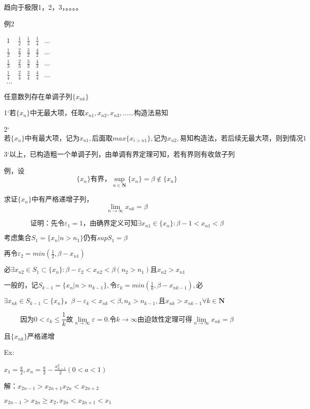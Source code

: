 \documentclass[12pt,a4paper]{article}
\begin{document}
趋向于极限1，2，3，。。。。

例2

$\begin{matrix}
1 & \frac{1}{2} & \frac{1}{3} & \frac{1}{4} & ...  \\
\frac{1}{2} & \frac{2}{2} & \frac{3}{2} & \frac{4}{2} & ... \\
\frac{1}{3} & \frac{2}{3} & \frac{3}{3} & \frac{4}{3} & ... \\
\frac{1}{4} & \frac{2}{4} & \frac{3}{4} & \frac{4}{4} & ... \\
...
\end{matrix}$

任意数列存在单调子列$\{x_{nk}\}$

1`$若\{x_n\}中无最大项，任取x_{n1},x_{n2},x_{n3},......构造法易知$

2`$若\{x_n\}中有最大项，记为x_{n1},后面取max\{x_{i>n1}\},记为x_{n2},易知构造法，若后续无最大项，则到情况1$

3`以上，已构造粗一个单调子列，由单调有界定理可知，若有界则有收敛子列


例，设$$\{x_n\}有界，\sup_{n \in \bm N}\{x_n\}=\beta \notin \{x_n\}$$

求证$\{x_n\}$中有严格递增子列，$$\lim_{n \to \infty}x_{nk}=\beta$$

$$
证明：先令\varepsilon_1=1，由确界定义可知\exists x_{n1} \in \{x_n\}:\beta -1 < x_{n1} < \beta
$$

$考虑集合S_1=\{x_n|n>n_1\}仍有sup S_1 = \beta$

$再令\varepsilon_2=min(\frac{1}{2},\beta-x_{n1})$

$必\exists x_{n2} \in S_1 \subset \{x_n\}: \beta- \varepsilon_2<x_{n2}<\beta (n_2>n_1)且x_{n2}>x_{n1}$

$一般的，记S_{k-1}=\{x_n|n>n_{k-1}\},令\varepsilon_k=min(\frac{1}{k},\beta-x_{nk-1}),必$

$\exists x_{nk} \in S_{k-1} \subset \{x_n\}，\beta - \varepsilon_k < x_{nk} < \beta, n_k > n_{k-1},且x_{nk} > x_{nk-1} \forall k \in \bm N$

$$因为0<\varepsilon_k \le \frac{1}{k} 故\lim_{n \to \infty}\varepsilon = 0. 令k \to \infty 由迫敛性定理可得 \lim_{n \to \infty}x_{nk}=\beta$$

$且\{x_{nk}\}严格递增$

Ex:

$x_1=\frac{a}{2}, x_n=\frac{a}{2}-\frac{x_{n-1}^2}{2}  (0<a<1)$

解：$x_{2n-1}>x_{2n+1}    x_{2n}<x_{2n+2}$

$x_{2n-1}>x_{2n} \ge x_2, x_{2n}<x_{2n+1}<x_1$
\end{document}
